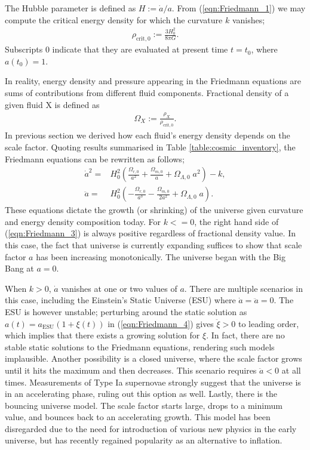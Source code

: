 The Hubble parameter is defined as $H := \dot{a}/a$. From (\ref{eqn:Friedmann_1}) we may compute the critical energy density for which the curvature $k$ vanishes;
\begin{align}
	\rho_{\text{crit},0} := \frac{3H_0^2}{8\pi G}.
\end{align}
Subscripts $0$ indicate that they are evaluated at present time $t=t_0$, where $a(t_0)=1$.

In reality, energy density and pressure appearing in the Friedmann equations are sums of contributions from different fluid components. Fractional density of a given fluid X is defined as
\begin{align}
	\Omega_X := \frac{\rho_X}{\rho_{\text{crit},0}}.
\end{align}
In previous section we derived how each fluid's energy density depends on the scale factor. Quoting results summarised in Table \ref{table:cosmic_inventory}, the Friedmann equations can be rewritten as follows;
\begin{align}
	\dot{a}^2 =& H_0^2 \left( \frac{\Omega_{r,0}}{a^2} + \frac{\Omega_{m,0}}{a} + \Omega_{\Lambda,0} \; a^2 \right) - k, \label{eqn:Friedmann_3}\\
	\ddot{a} =& H_0^2 \left( - \frac{\Omega_{r,0}}{a^3} - \frac{\Omega_{m,0}}{2a^2} + \Omega_{\Lambda,0} \; a \right). \label{eqn:Friedmann_4}
\end{align}
These equations dictate the growth (or shrinking) of the universe given curvature and energy density composition today. For $k <= 0$, the right hand side of (\ref{eqn:Friedmann_3}) is always positive regardless of fractional density value. In this case, the fact that universe is currently expanding suffices to show that scale factor $a$ has been increasing monotonically. The universe began with the Big Bang at $a=0$.

When $k > 0$, $\dot{a}$ vanishes at one or two values of $a$. There are multiple scenarios in this case, including the Einstein's Static Universe (ESU) where $\dot{a} = \ddot{a} = 0$. The ESU is however unstable; perturbing around the static solution as $a(t)=a_{\text{ESU}}(1+\xi(t))$ in (\ref{eqn:Friedmann_4}) gives $\ddot{\xi}>0$ to leading order, which implies that there exists a growing solution for $\xi$. In fact, there are no stable static solutions to the Friedmann equations, rendering such models implausible. Another possibility is a closed universe, where the scale factor grows until it hits the maximum and then decreases. This scenario requires $\ddot{a}<0$ at all times. Measurements of Type Ia supernovae strongly suggest that the universe is in an accelerating phase, ruling out this option as well. Lastly, there is the bouncing universe model. The scale factor starts large, drops to a minimum value, and bounces back to an accelerating growth. This model has been disregarded due to the need for introduction of various new physics in the early universe, but has recently regained popularity as an alternative to inflation.

